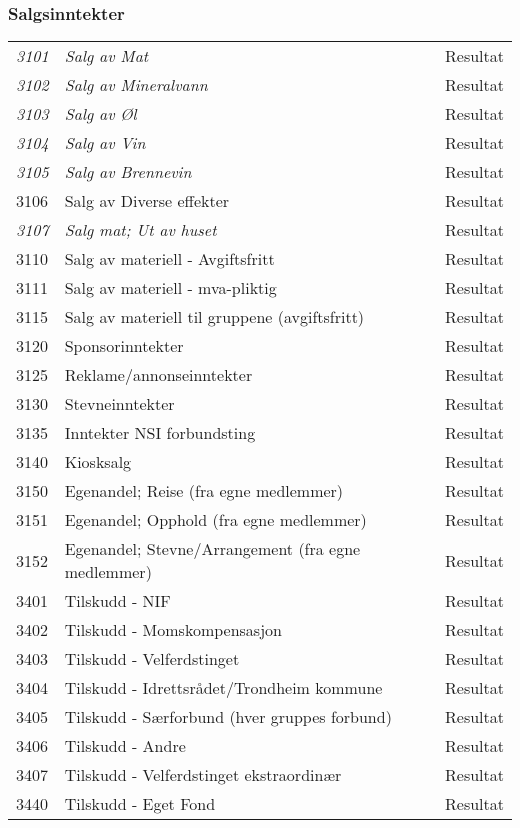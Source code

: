 \subsubsection*{Salgsinntekter}
\begin{table}[H]
	\begin{tabular}{l l l }
\emph{3101} & \emph{Salg av Mat} & Resultat\\
\emph{3102} & \emph{Salg av Mineralvann} & Resultat\\
\emph{3103} & \emph{Salg av Øl} & Resultat\\
\emph{3104} & \emph{Salg av Vin} & Resultat\\
\emph{3105} & \emph{Salg av Brennevin} & Resultat\\
3106 & Salg av Diverse effekter & Resultat\\
\emph{3107} & \emph{Salg mat; Ut av huset} & Resultat\\
3110 & Salg av materiell - Avgiftsfritt & Resultat\\
3111 & Salg av materiell - mva-pliktig & Resultat\\
3115 & Salg av materiell til gruppene (avgiftsfritt) & Resultat\\
3120 & Sponsorinntekter & Resultat\\
3125 & Reklame/annonseinntekter & Resultat\\
3130 & Stevneinntekter & Resultat\\
3135 & Inntekter NSI forbundsting & Resultat\\
3140 & Kiosksalg & Resultat\\
3150 & Egenandel; Reise (fra egne medlemmer) & Resultat\\
3151 & Egenandel; Opphold (fra egne medlemmer) & Resultat\\
3152 & Egenandel; Stevne/Arrangement (fra egne medlemmer) & Resultat\\
3401 & Tilskudd - NIF & Resultat\\
3402 & Tilskudd - Momskompensasjon & Resultat\\
3403 & Tilskudd - Velferdstinget & Resultat\\
3404 & Tilskudd - Idrettsrådet/Trondheim kommune & Resultat\\
3405 & Tilskudd - Særforbund (hver gruppes forbund) & Resultat\\
3406 & Tilskudd - Andre & Resultat\\
3407 & Tilskudd - Velferdstinget ekstraordinær & Resultat\\
3440 & Tilskudd - Eget Fond & Resultat\\
	\end{tabular}
\end{table}
